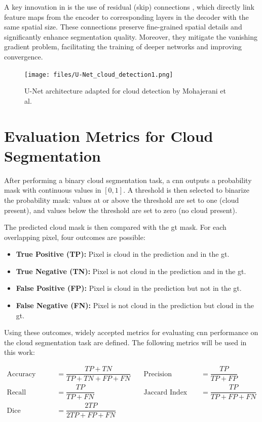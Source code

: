{A key innovation in  is the use of residual (skip) connections \cite{he2015deepresiduallearningimage},
which directly link feature maps from the encoder to corresponding layers in the decoder with the same spatial size.
These connections preserve fine-grained spatial details and significantly enhance segmentation quality.
Moreover, they mitigate the vanishing gradient problem, facilitating the training of deeper networks and improving convergence.

\begin{figure}[H]
  \centering
  \texttt{[image: files/U-Net\_cloud\_detection1.png]}
  \caption{U-Net architecture adapted for cloud detection by Mohajerani et al.~\cite{CloudNet2019}}
  \label{fig:unet-architecture}
\end{figure}

\section{Evaluation Metrics for Cloud Segmentation}
\label{subsec:evalmetrics}

After performing a binary cloud segmentation task, a \gls{cnn} outputs a probability mask
with continuous values in \([0,1]\).
A threshold is then selected to binarize the probability mask:
values at or above the threshold are set to one (cloud present), and values below the threshold are set to zero (no cloud present).


The predicted cloud mask is then compared with the \gls{gt} mask.
For each overlapping pixel, four outcomes are possible:

\begin{itemize}
    \item \textbf{True Positive (TP):} Pixel is cloud in the prediction and in the \gls{gt}.
    \item \textbf{True Negative (TN):} Pixel is not cloud in the prediction and in the \gls{gt}.
    \item \textbf{False Positive (FP):} Pixel is cloud in the prediction but not in the \gls{gt}.
    \item \textbf{False Negative (FN):} Pixel is not cloud in the prediction but cloud in the \gls{gt}.
\end{itemize}

Using these outcomes, widely accepted metrics for evaluating \gls{cnn} performance on the cloud segmentation task are defined.
The following metrics will be used in this work:

\[
\begin{array}{llcl}
\text{Accuracy}  &= \dfrac{TP + TN}{TP + TN + FP + FN} 
& \quad \text{Precision} &= \dfrac{TP}{TP + FP} \\[1.2em]
\text{Recall}    &= \dfrac{TP}{TP + FN} 
& \quad \text{Jaccard Index (IoU)} &= \dfrac{TP}{TP + FP + FN} \\[1.2em]
\text{Dice Coefficient} &= \dfrac{2TP}{2TP + FP + FN} & &
\end{array}
\]

}
